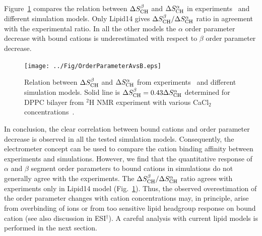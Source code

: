 \documentclass[twoside,twocolumn,9pt]{article}
\begin{document}
Figure~\ref{AvsB} compares the relation between $\Delta S_{\rm{CH}}^{\beta}$ and $\Delta S_{\rm{CH}}^{\alpha}$
in experiments~\cite{akutsu81} and different simulation models.
Only Lipid14 gives $\Delta S_{\rm{CH}}^{\beta}/\Delta S_{\rm{CH}}^{\alpha}$ ratio in agreement with the experimental ratio.
In all the other models the $\alpha$ order parameter decrease with bound cations is underestimated with
respect to $\beta$ order parameter decrease.
\begin{figure}[t]
  \centering
  \texttt{[image: ../Fig/OrderParameterAvsB.eps]}
  \caption{\label{AvsB}
    Relation between $\Delta S_{\rm{CH}}^{\beta}$ and $\Delta S_{\rm{CH}}^{\alpha}$ from experiments~\cite{akutsu81} and
    different simulation models. Solid line is $\Delta S_{\rm{CH}}^{\beta}=0.43\Delta S_{\rm{CH}}^{\alpha}$ determined for DPPC bilayer
    from $^2$H NMR experiment with various CaCl$_2$ concentrations~\cite{akutsu81}.
  }
\end{figure}




In conclusion, the clear correlation between bound cations and order parameter decrease 
is observed in all the tested simulation models. Consequently, the electrometer concept can 
be used to compare the cation binding affinity between experiments and simulations. 
However, we find that the quantitative response of $\alpha$ and $\beta$ segment order parameters to bound cations in simulations 
do not generally agree with the experiments. The $\Delta S_{\rm{CH}}^{\beta}/\Delta S_{\rm{CH}}^{\alpha}$ ratio  
agrees with experiments only in Lipid14 model (Fig.~\ref{AvsB}). 
Thus, the observed overestimation of the order parameter changes with cation concentrations may, in principle, arise
from overbinding of ions or from too sensitive lipid headgroup response on bound cation 
(see also discussion in ESI$^\dag$). 
A careful analysis with current lipid models is performed in the next section.
\end{document}
